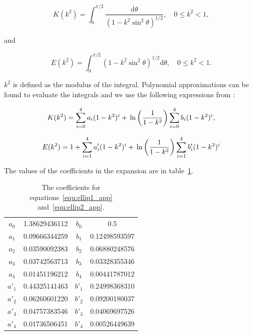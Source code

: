 \documentclass[12pt]{article}
\begin{document}
\begin{equation}
\label{equ:ellip1}
K(k^{2}) = \int_{0}^{\pi/2} \frac{\mathrm{d}\theta}{(1 - k^{2} \sin^{2}\theta)^{1/2}}, \quad 0 \leq k^{2} < 1,
\end{equation}

and

\begin{equation}
\label{equ:ellip2}
E(k^{2}) = \int_{0}^{\pi/2} (1 - k^{2} \sin^{2}\theta)^{1/2} \mathrm{d}\theta, \quad 0 \leq k^{2} < 1.
\end{equation}


$k^{2}$ is defined as the modulus of the integral. Polynomial approximations can be found to evaluate the integrals \citep{Roumeliotis00} and we use the following expressions from \citet{Abramowitz72}:

\begin{equation}
\label{equ:ellip1_app}
K(k^{2}) = \sum_{i = 0}^{4} a_{i} (1 - k^{2})^{i} + \\\ln\left(\frac{1}{1 - k^{2}} \right) \sum_{i = 0}^{4} b_{i} (1 - k^{2})^{i},
\end{equation}

\begin{equation}
\label{equ:ellip2_app}
E(k^{2}) = 1 + \sum_{i = 1}^{4} a'_{i} (1 - k^{2})^{i} + \\\ln\left(\frac{1}{1 - k^{2}} \right) \sum_{i = 1}^{4} b'_{i} (1 - k^{2})^{i}
\end{equation}

The values of the coefficients in the expansion are in table~\ref{tab:ellip_poly_coeff}.

\begin{table}
\caption{\label{tab:ellip_poly_coeff} The coefficients for equations~\ref{equ:ellip1_app} and~\ref{equ:ellip2_app}.}
\begin{center}
\begin{tabular}{|c|c|c|c|}
\hline
$a_{0}$ & 1.38629436112 & $b_{0}$ & 0.5 \\
$a_{1}$ & 0.09666344259 & $b_{1}$ & 0.12498593597 \\
$a_{2}$ & 0.03590092383 & $b_{2}$ & 0.06880248576 \\
$a_{3}$ & 0.03742563713 & $b_{3}$ & 0.03328355346 \\
$a_{4}$ & 0.01451196212 & $b_{4}$ & 0.00441787012 \\
\hline
$a'_{1}$ & 0.44325141463 & $b'_{1}$ & 0.24998368310 \\
$a'_{2}$ & 0.06260601220 & $b'_{2}$ & 0.09200180037 \\
$a'_{3}$ & 0.04757383546 & $b'_{3}$ & 0.04069697526 \\
$a'_{4}$ & 0.01736506451 & $b'_{4}$ & 0.00526449639 \\
\hline
\end{tabular}
\end{center} 
\end{table}
\end{document}
